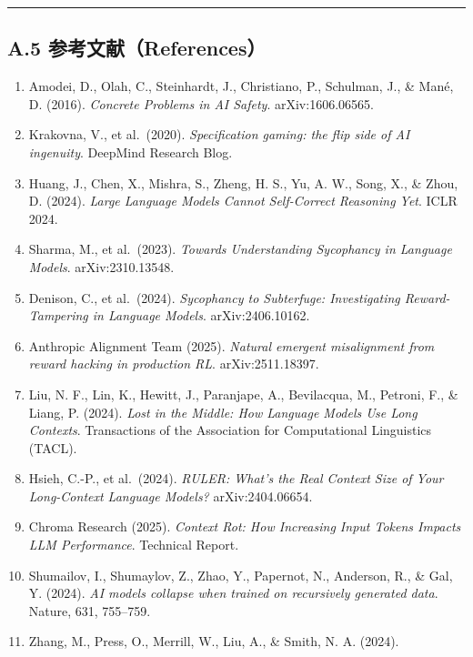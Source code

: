 \documentclass[
]{ctexart}
\providecommand{\tightlist}{%
  \setlength{\itemsep}{0pt}\setlength{\parskip}{0pt}}
\renewcommand{\_}{\discretionary{}{}{\textunderscore}}
\begin{document}
\begin{center}\rule{0.5\linewidth}{0.5pt}\end{center}

\subsection{A.5
参考文献（References）}\label{a5-ux53c2ux8003ux6587ux732e-references}

\begin{enumerate}
\def\labelenumi{\arabic{enumi}.}
\tightlist
\item
  Amodei, D., Olah, C., Steinhardt, J., Christiano, P., Schulman, J., \&
  Mané, D. (2016). \emph{Concrete Problems in AI Safety}.
  arXiv:1606.06565.
\item
  Krakovna, V., et al.~(2020). \emph{Specification gaming: the flip side
  of AI ingenuity}. DeepMind Research Blog.
\item
  Huang, J., Chen, X., Mishra, S., Zheng, H. S., Yu, A. W., Song, X., \&
  Zhou, D. (2024). \emph{Large Language Models Cannot Self-Correct
  Reasoning Yet}. ICLR 2024.
\item
  Sharma, M., et al.~(2023). \emph{Towards Understanding Sycophancy in
  Language Models}. arXiv:2310.13548.
\item
  Denison, C., et al.~(2024). \emph{Sycophancy to Subterfuge:
  Investigating Reward-Tampering in Language Models}. arXiv:2406.10162.
\item
  Anthropic Alignment Team (2025). \emph{Natural emergent misalignment
  from reward hacking in production RL}. arXiv:2511.18397.
\item
  Liu, N. F., Lin, K., Hewitt, J., Paranjape, A., Bevilacqua, M.,
  Petroni, F., \& Liang, P. (2024). \emph{Lost in the Middle: How
  Language Models Use Long Contexts}. Transactions of the Association
  for Computational Linguistics (TACL).
\item
  Hsieh, C.-P., et al.~(2024). \emph{RULER: What's the Real Context Size
  of Your Long-Context Language Models?} arXiv:2404.06654.
\item
  Chroma Research (2025). \emph{Context Rot: How Increasing Input Tokens
  Impacts LLM Performance}. Technical Report.
\item
  Shumailov, I., Shumaylov, Z., Zhao, Y., Papernot, N., Anderson, R., \&
  Gal, Y. (2024). \emph{AI models collapse when trained on recursively
  generated data}. Nature, 631, 755--759.
\item
  Zhang, M., Press, O., Merrill, W., Liu, A., \& Smith, N. A. (2024).

\end{enumerate}
\end{document}

